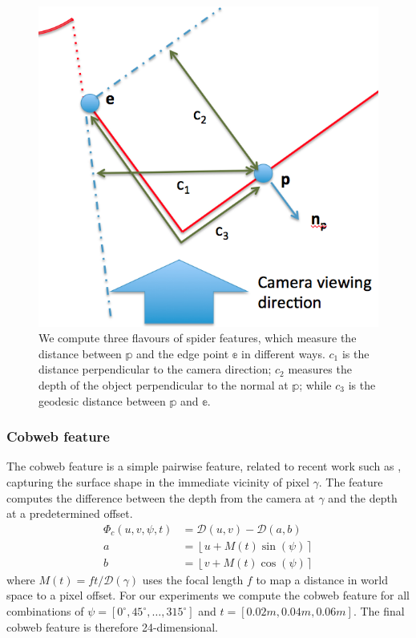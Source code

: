 \documentclass[10pt,twocolumn,letterpaper]{article}
\newcommand{\degree}{^{\circ}}
\newcommand{\rgbdimage}{\mathcal{D}}
\newcommand{\pixelidx}{\gamma}
\newcommand{\note}[1]{\textcolor{blue}{NOTE: #1}}
\begin{document}
\begin{figure}
    \centering 
    \includegraphics[width=1.0\columnwidth]{compass_features}
    \caption{We compute three flavours of spider features, which measure the distance between $\mathbb{p}$ and the edge point $\mathbb{e}$ in different ways. $c_1$ is the distance perpendicular to the camera direction; $c_2$ measures the depth of the object perpendicular to the normal at $\mathbb{p}$; while $c_3$ is the geodesic distance between $\mathbb{p}$ and $\mathbb{e}$.}
    \label{fig:spider_features}
\end{figure}


\subsubsection{Cobweb feature }
The cobweb feature is a simple pairwise feature, related to recent work such as \cite{shotton-cvpr-2011, tola-pami-2010}, capturing the surface shape in the immediate vicinity of pixel $\pixelidx$.
The feature computes the difference between the depth from the camera at $\pixelidx$ and the depth at a predetermined offset.
\begin{align}
\Phi_c(u, v, \psi, t) &= \rgbdimage(u, v) - \rgbdimage(a, b) \\
a &= \left\lfloor u + M(t)  \sin(\psi) \right\rceil \\
b &= \left\lfloor v + M(t)  \cos(\psi) \right\rceil
\end{align}
where $M(t) = ft / \rgbdimage(\pixelidx)$ uses the focal length $f$ to map a distance in world space to a pixel offset. For our experiments we compute the cobweb feature for all combinations of $\psi = [0\degree, 45\degree, \ldots, 315\degree]$ and $t = [0.02m, 0.04m, 0.06m]$.
The final cobweb feature is therefore 24-dimensional.
\end{document}
